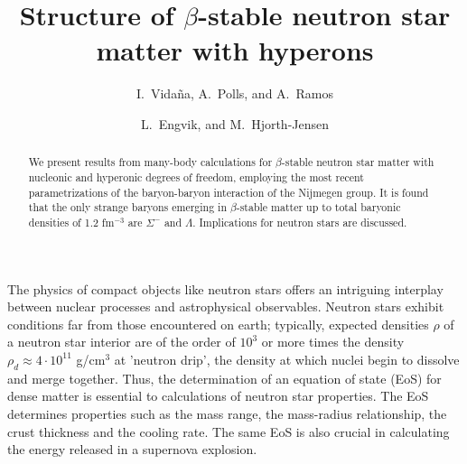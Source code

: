 



\draft



\title{Structure of $\beta$-stable neutron star 
       matter with hyperons}

\author{I.\ Vida\~na, A.\ Polls, and A.\ Ramos}

\address{Departament d'Estructura i Constituents de la Mat\`eria,
Universitat de Barcelona, E-08028 Barcelona, Spain}

\author{L.\ Engvik, and M.\  Hjorth-Jensen}

\address{Department of Physics, University of Oslo, N-0316 Oslo, Norway}

\maketitle

\begin{abstract}

We present results from many-body calculations 
for $\beta$-stable neutron star 
matter with nucleonic and
hyperonic degrees of freedom, employing the most recent parametrizations
of the baryon-baryon interaction of the Nijmegen group. 
It is found that the only strange baryons emerging in $\beta$-stable matter 
up to total baryonic densities of 1.2 fm$^{-3}$ are $\Sigma^-$ and 
$\Lambda$.
Implications for neutron stars are discussed.    


\end{abstract}




The physics of compact objects like neutron stars offers
an intriguing interplay between nuclear processes  and
astrophysical observables.
Neutron stars exhibit conditions far from those 
encountered on earth; typically, expected densities $\rho$ 
of a neutron star interior are of the
order of $10^3$ or more times the density  
$\rho_d\approx 4\cdot 10^{11}$ g/cm$^{3}$ at 'neutron drip',
the density at which nuclei begin to 
dissolve and merge together.
Thus, the determination of an equation of state (EoS) 
for dense matter is essential to calculations of neutron 
star properties. The EoS determines properties  such as 
the mass range, the mass-radius relationship, the crust 
thickness and the cooling rate.
The same EoS is also crucial
in calculating the energy released in a supernova explosion.

